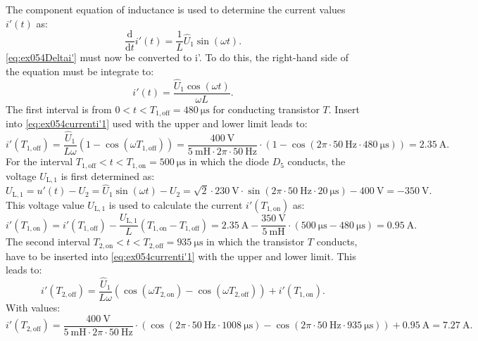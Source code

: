 
\begin{solutionblock}
    The component equation of inductance is used to determine the current values $i'(t)$ as:
    \begin{equation}
        \frac{\mathrm{d}}{\mathrm{d}t}i'(t) = \frac{1}{L}\hat U_\mathrm{1} \sin(\omega t).\label{eq:ex054Deltai'}
    \end{equation}
    \eqref{eq:ex054Deltai'} must now be converted to i'. To do this, the right-hand side of the equation must be integrate to:
    \begin{equation}
        i'(t)=\frac{\hat U_\mathrm{1} \cos(\omega t)}{\omega L}.\label{eq:ex054currenti'1}
    \end{equation}
    The first interval is from $0 < t < T_\mathrm{1,off} = \SI{480}{\micro\s}$ for conducting transistor $T$. Insert into \eqref{eq:ex054currenti'1} used with the upper and lower limit leads to:
    \begin{equation}
        i'(T_\mathrm{1,off}) = \frac{\hat U_\mathrm{1}}{L \omega}(1- \cos(\omega T_\mathrm{1,off})) = \frac{\SI{400}{\volt}}{\SI{5}{\milli\henry}\cdot 2\pi \cdot \SI{50}{\hertz}}\cdot (1-\cos(2\pi \cdot \SI{50}{\hertz} \cdot \SI{480}{\micro\s})) = \SI{2.35}{\ampere}.
    \end{equation}
    For the interval $T_\mathrm{1,off} < t < T_\mathrm{1,on} = \SI{500}{\micro\s}$ in which the diode $D_\mathrm{5}$ conducts, the voltage $U_\mathrm{L,1}$ is first determined as:
    \begin{equation}
        U_\mathrm{L,1} = u'(t) - U_\mathrm{2}= \hat U_\mathrm{1} \sin(\omega t) - U_\mathrm{2} = \sqrt{2} \cdot \SI{230}{\volt} \cdot \sin(2\pi \cdot \SI{50}{\hertz}\cdot \SI{20}{\micro\s}) - \SI{400}{\volt} = -\SI{350}{\volt}.
    \end{equation}
    This voltage value  $U_\mathrm{L,1}$ is used to calculate the current  $i'(T_\mathrm{1,on})$ as:
    \begin{equation}
        i'(T_\mathrm{1,on}) = i'(T_\mathrm{1,off}) -\frac{ U_\mathrm{L,1}}{L}(T_\mathrm{1,on}-T_\mathrm{1,off}) = \SI{2.35}{\ampere} -\frac{\SI{350}{\volt}}{\SI{5}{\milli\henry}}\cdot (\SI{500}{\micro\s}-\SI{480}{\micro\s}) = \SI{0.95}{\ampere}.
    \end{equation}
     The second interval  $T_\mathrm{2,on} < t < T_\mathrm{2,off}  = \SI{935}{\micro\s}$ in which the transistor $T$ conducts, have to be inserted  into \eqref{eq:ex054currenti'1} with the upper and lower limit. This leads to:
     \begin{equation}
        i'(T_\mathrm{2,off}) = \frac{\hat U_\mathrm{1}}{L \omega}(\cos (\omega T_\mathrm{2,on})- \cos(\omega T_\mathrm{2,off}))+ i'(T_\mathrm{1,on}).
    \end{equation}
    With values:
    \begin{equation}
        i'(T_\mathrm{2,off}) = \frac{\SI{400}{\volt}}{\SI{5}{\milli\henry}\cdot 2\pi \cdot \SI{50}{\hertz}}\cdot (\cos(2\pi \cdot \SI{50}{\hertz}\cdot \SI{1008}{\micro\s})-\cos(2\pi \cdot \SI{50}{\hertz} \cdot \SI{935}{\micro\s})) + \SI{0.95}{\ampere}= \SI{7.27}{\ampere}.
     \end{equation}


\end{solutionblock}
